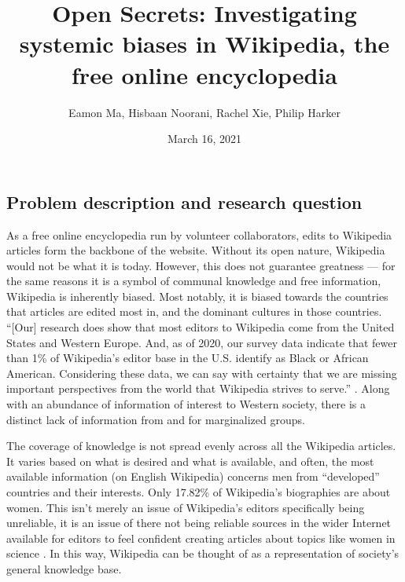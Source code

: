 \documentclass[fontsize=12pt]{article}
\title{Open Secrets: Investigating systemic biases in Wikipedia, the free online encyclopedia}
\author{Eamon Ma, Hisbaan Noorani, Rachel Xie, Philip Harker}
\date{March 16, 2021}
\begin{document}
\maketitle
\begin{multicols}{2}


    \section{Problem description and research question}  %

    As a free online encyclopedia run by volunteer collaborators, edits to Wikipedia articles form the backbone of the website.
    Without its open nature, Wikipedia would not be what it is today.
    However, this does not guarantee greatness --- for the same reasons it is a symbol of communal knowledge and free information, Wikipedia is inherently biased.
    Most notably, it is biased towards the countries that articles are edited most in, and the dominant cultures in those countries.
    ``[Our] research does show that most editors to Wikipedia come from the United States and Western Europe. And, as of 2020, our survey data indicate that fewer than 1\% of Wikipedia’s editor base in the U.S. identify as Black or African American. Considering these data, we can say with certainty that we are missing important perspectives from the world that Wikipedia strives to serve.'' \parencite{Uzzell}.
    Along with an abundance of information of interest to Western society, there is a distinct lack of information from and for marginalized groups.

    The coverage of knowledge is not spread evenly across all the Wikipedia articles.
    It varies based on what is desired and what is available, and often, the most available information (on English Wikipedia) concerns men from ``developed'' countries and their interests.
    Only 17.82\% of Wikipedia's biographies are about women.
    This isn't merely an issue of Wikipedia's editors specifically being unreliable, it is an issue of there not being reliable sources in the wider Internet available for editors to feel confident creating articles about topics like women in science \parencite{Erhart}.
    In this way, Wikipedia can be thought of as a representation of society's general knowledge base.


\end{multicols}
\end{document}
